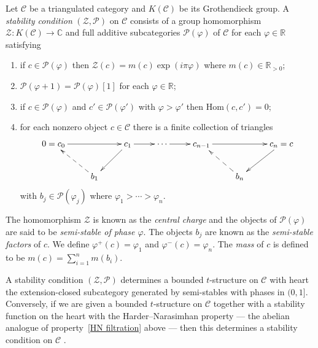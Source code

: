 \documentclass{article}
\theoremstyle{plain}
\theoremstyle{definition}
\theoremstyle{remark}
\newcommand{\defn}[1]{\emph{#1}}
\newcommand{\R}{\mathbb{R}}
\newcommand{\C}{\mathbb{C}}
\newcommand{\cat}[1]{\mathcal{#1}}
\newcommand{\mor}[2]{{\mathrm{Hom}}(#1,#2)}
\begin{document}
Let $\cat{C}$ be a triangulated category and $K(\cat{C})$ be its Grothendieck group. A \defn{stability condition} $(\mathcal{Z},\mathcal{P})$ on $\cat{C}$ \cite[Definition 1.1]{MR2373143} consists of a group homomorphism $\mathcal{Z} : K(\cat{C}) \to \C$ and full additive subcategories $\mathcal{P}(\varphi)$ of $\cat{C}$ for each $\varphi\in \R$ satisfying
\begin{enumerate}
\item if $c\in \mathcal{P}(\varphi)$ then $\mathcal{Z}(c) = m(c)\exp(i\pi \varphi)$ where $m(c) \in \R_{>0}$;
\item $\mathcal{P}(\varphi+1) = \mathcal{P}(\varphi)[1]$ for each $\varphi\in \R$;
\item if $c\in \mathcal{P}(\varphi)$ and $c' \in \mathcal{P}(\varphi')$ with $\varphi > \varphi'$ then $\mor{c}{c'}=0$;
\item\label{HN filtration} for each nonzero object $c\in \cat{C}$ there is a finite collection of triangles
$$
\xymatrix{
0=c_0 \ar[rr] && c_1 \ar[r] \ar[dl] & \cdots \ar[r] & c_{n-1} \ar[rr] && c_n=c \ar[dl]\\
& b_1\ar@{-->}[ul] &&&& b_n \ar@{-->}[ul]
}
$$
with $b_j \in \mathcal{P}(\varphi_j)$ where $\varphi_1 > \cdots > \varphi_n$.
\end{enumerate}
The homomorphism $\mathcal{Z}$ is known as the \defn{central charge} and the objects of $\mathcal{P}(\varphi)$ are said to be \defn{semi-stable of phase $\varphi$}. The objects $b_j$ are known as the \defn{semi-stable factors} of $c$. We define  $\varphi^+(c)=\varphi_1$ and $\varphi^-(c)=\varphi_n$. The \defn{mass}  of $c$ is defined to be $m(c)=\sum_{i=1}^n m(b_i)$. 

A stability condition $(\mathcal{Z},\mathcal{P})$ determines a bounded $t$-structure on $\cat{C}$ with heart the extension-closed subcategory generated by semi-stables with phases in $(0,1]$. Conversely, if we are given a bounded $t$-structure on $\cat{C}$ together with a stability function on the heart with the Harder--Narasimhan property --- the abelian analogue of property~\ref{HN filtration} above --- then this determines a stability condition on $\cat{C}$ \cite[Proposition 5.3]{MR2373143}.
\end{document}
